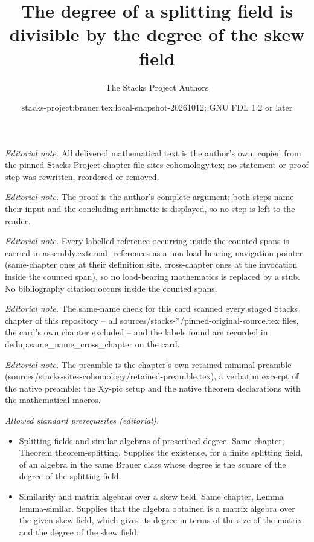 \documentclass[10pt,a4paper]{amsart}
\title{The degree of a splitting field is divisible by the degree of the skew field}
\author{The Stacks Project Authors}
\date{stacks-project:brauer.tex:local-snapshot-20261012; GNU FDL 1.2 or later}
\theoremstyle{plain}
\theoremstyle{definition}
\theoremstyle{remark}
\numberwithin{equation}{subsection}
\begin{document}
\maketitle
\noindent\textit{Editorial note.} All delivered mathematical text is the author's own, copied from the pinned Stacks Project chapter file sites-cohomology.tex; no statement or proof step was rewritten, reordered or removed.\par\medskip
\noindent\textit{Editorial note.} The proof is the author's complete argument; both steps name their input and the concluding arithmetic is displayed, so no step is left to the reader.\par\medskip
\noindent\textit{Editorial note.} Every labelled reference occurring inside the counted spans is carried in assembly.external\_references as a non-load-bearing navigation pointer (same-chapter ones at their definition site, cross-chapter ones at the invocation inside the counted span), so no load-bearing mathematics is replaced by a stub. No bibliography citation occurs inside the counted spans.\par\medskip
\noindent\textit{Editorial note.} The same-name check for this card scanned every staged Stacks chapter of this repository -- all sources/stacks-*/pinned-original-source.tex files, the card's own chapter excluded -- and the labels found are recorded in dedup.same\_name\_cross\_chapter on the card.\par\medskip
\noindent\textit{Editorial note.} The preamble is the chapter's own retained minimal preamble (sources/stacks-sites-cohomology/retained-preamble.tex), a verbatim excerpt of the native preamble: the Xy-pic setup and the native theorem declarations with the mathematical macros.\par\medskip
\noindent\textit{Allowed standard prerequisites (editorial).}\begin{itemize}
\item Splitting fields and similar algebras of prescribed degree. Same chapter, Theorem theorem-splitting. Supplies the existence, for a finite splitting field, of an algebra in the same Brauer class whose degree is the square of the degree of the splitting field.
\item Similarity and matrix algebras over a skew field. Same chapter, Lemma lemma-similar. Supplies that the algebra obtained is a matrix algebra over the given skew field, which gives its degree in terms of the size of the matrix and the degree of the skew field.
\end{itemize}\medskip
\end{document}
